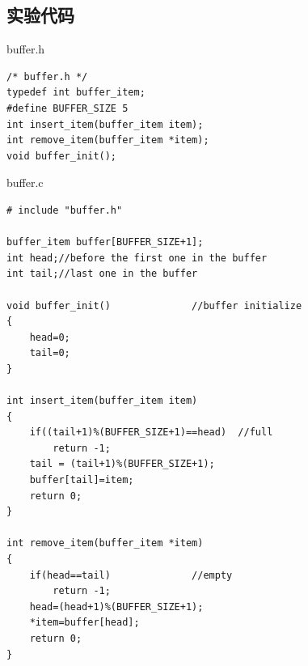 \documentclass{article}
\begin{document}
\subsection{实验代码}
\begin{center}
{\ttfamily buffer.h}
\end{center}
\begin{lstlisting}[language={[ANSI]C}]
/* buffer.h */
typedef int buffer_item;
#define BUFFER_SIZE 5
int insert_item(buffer_item item);
int remove_item(buffer_item *item);
void buffer_init();
\end{lstlisting}
\begin{center}
{\ttfamily buffer.c}
\end{center}
\begin{lstlisting}[language={[ANSI]C}]
# include "buffer.h"

buffer_item buffer[BUFFER_SIZE+1];
int head;//before the first one in the buffer
int tail;//last one in the buffer

void buffer_init()				//buffer initialize
{
	head=0;
	tail=0;
}

int insert_item(buffer_item item)
{
	if((tail+1)%(BUFFER_SIZE+1)==head)	//full
		return -1;
	tail = (tail+1)%(BUFFER_SIZE+1);
	buffer[tail]=item;
	return 0;
}

int remove_item(buffer_item *item)
{
	if(head==tail)				//empty
		return -1;
	head=(head+1)%(BUFFER_SIZE+1);
	*item=buffer[head];
	return 0;
}
\end{lstlisting}
\end{document}
